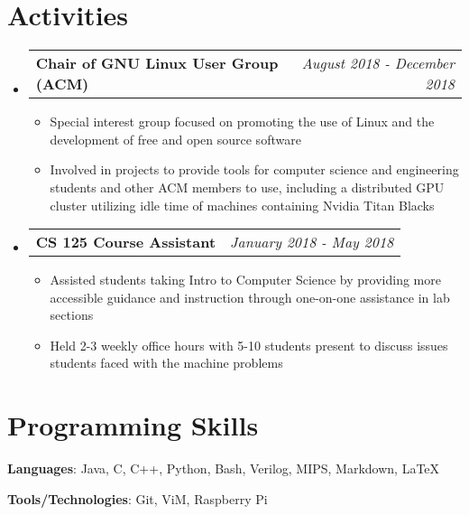\documentclass[letterpaper,11pt]{article}
\makeatletter
\newcommand{\resumeBullet}[1]
{\item\small
	{#1 \vspace{-2pt}
	}
}
\newcommand{\resumeSubheading}[2]
{\vspace{-1pt}\item[]
	\begin{tabular*}{0.97\textwidth}{l@{\extracolsep{\fill}}r}
		\textbf{#1} & \textit{\small #2} \\
	\end{tabular*}\vspace{-6pt}
}
\newcommand{\resumeSubHeadingListStart}{\begin{itemize}[leftmargin=*,itemsep=0.2pt]}
\newcommand{\resumeSubHeadingListEnd}{\end{itemize}}
\newcommand{\resumeItemListStart}{\begin{itemize}[itemsep=0.2pt]}
\newcommand{\resumeItemListEnd}{\end{itemize}\vspace{-5pt}}
\makeatother
\begin{document}
\section{Activities}
  \resumeSubHeadingListStart
  	\resumeSubheading
  	{Chair of GNU Linux User Group (ACM)}{August 2018 - December 2018}
  	\resumeItemListStart
  		\resumeBullet
  		{Special interest group focused on promoting the use of Linux and the development of free and open source software}
  		\resumeBullet
  		{Involved in projects to provide tools for computer science and engineering students and other ACM members to use, including a distributed GPU cluster utilizing idle time of machines containing Nvidia Titan Blacks}
  	\resumeItemListEnd
  	\resumeSubheading
  	{CS 125 Course Assistant}{January 2018 - May 2018}
  	\resumeItemListStart
  	\resumeBullet
  	{Assisted students taking Intro to Computer Science by providing more accessible guidance and instruction through one-on-one assistance in lab sections}
  	\resumeBullet
  	{Held 2-3 weekly office hours with 5-10 students present to discuss issues students faced with the machine problems}
  	\resumeItemListEnd
  \resumeSubHeadingListEnd

\section{Programming Skills}
  \resumeSubHeadingListStart
\begin{multicols}{2}
  	\item[]{
        \textbf{Languages}{: Java, C, C++, Python, Bash, Verilog, MIPS, Markdown, LaTeX}
    }
	\hfill
	\item[]{
      	\textbf{Tools/Technologies}{: Git, ViM, Raspberry Pi}
    }
\end{multicols}
\resumeSubHeadingListEnd


\end{document}
